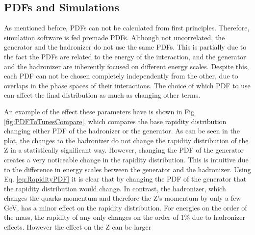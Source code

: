 \subsection{PDFs and Simulations}
As mentioned before, PDFs can not be calculated from first principles. Therefore, simulation software is fed premade PDFs. Although not uncorrelated, the generator and the hadronizer do not use the same PDFs. This is partially due to the fact the PDFs are related to the energy of the interaction, and the generator and the hadronizer are inherently focused on different energy scales. Despite this, each PDF can not be chosen completely independently from the other, due to overlaps in the phase spaces of their interactions. The choice of which PDF to use can affect the final distribution as much as changing other terms.

An example of the effect these parameters have is shown in Fig \ref{fig:PDFToTunesCompare}, which compares the base \Z rapidity distribution changing either PDF of the hadronizer or the generator. As can be seen in the plot, the changes to the hadronizer do not change the rapidity distribution of the Z in a statistically significant way. However, changing the PDF of the generator creates a very noticeable change in the rapidity distribution. This is intuitive due to the difference in energy scales between the generator and the hadronizer. Using Eq. \ref{eq:RapidityPDF} it is clear that by changing the PDF of the generator that the rapidity distribution would change. In contrast, the hadronizer, which changes the quarks momentum and therefore the Z's momentum by only a few GeV, has a minor effect on the rapidity distribution. For energies on the order of the \Z mass, the rapidity of any \Z only changes on the order of 1\% due to hadronizer effects. However the effect on the Z \pt can be larger 



